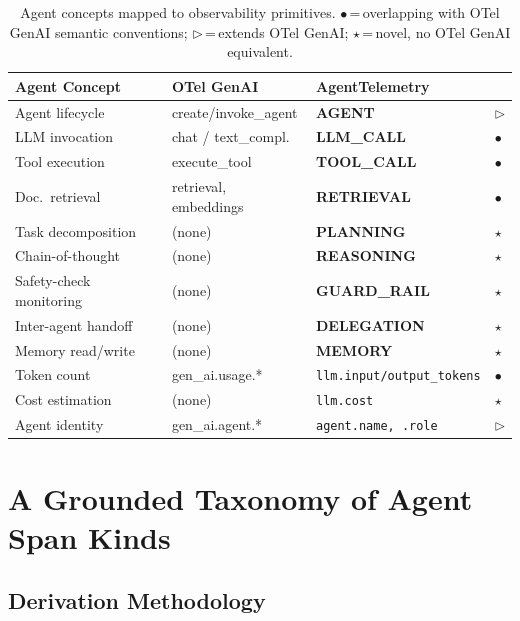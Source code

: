 \documentclass[sigplan,10pt,screen]{acmart}
\begin{document}
\begin{table}[t]
\centering
\small
\caption{Agent concepts mapped to observability primitives.
$\bullet$\,=\,overlapping with OTel GenAI semantic conventions;
$\triangleright$\,=\,extends OTel GenAI; $\star$\,=\,novel, no OTel GenAI equivalent.}
\label{tab:gap}
\begin{tabular}{@{}llll@{}}
\toprule
\textbf{Agent Concept} & \textbf{OTel GenAI} & \textbf{AgentTelemetry} & \\
\midrule
Agent lifecycle    & create/invoke\_agent  & \textbf{AGENT} & $\triangleright$ \\
LLM invocation     & chat / text\_compl.   & \textbf{LLM\_CALL} & $\bullet$ \\
Tool execution     & execute\_tool         & \textbf{TOOL\_CALL} & $\bullet$ \\
Doc.\ retrieval    & retrieval, embeddings & \textbf{RETRIEVAL} & $\bullet$ \\
Task decomposition & (none)                & \textbf{PLANNING} & $\star$ \\
Chain-of-thought   & (none)                & \textbf{REASONING} & $\star$ \\
Safety-check monitoring & (none)               & \textbf{GUARD\_RAIL} & $\star$ \\
Inter-agent handoff & (none)               & \textbf{DELEGATION} & $\star$ \\
Memory read/write  & (none)                & \textbf{MEMORY} & $\star$ \\
Token count        & gen\_ai.usage.*       & \texttt{llm.input/output\_tokens} & $\bullet$ \\
Cost estimation    & (none)                & \texttt{llm.cost} & $\star$ \\
Agent identity     & gen\_ai.agent.*       & \texttt{agent.name, .role} & $\triangleright$ \\
\bottomrule
\end{tabular}
\end{table}

\section{A Grounded Taxonomy of Agent Span Kinds}
\label{sec:taxonomy}

\subsection{Derivation Methodology}
\label{sec:derivation}
\end{document}

